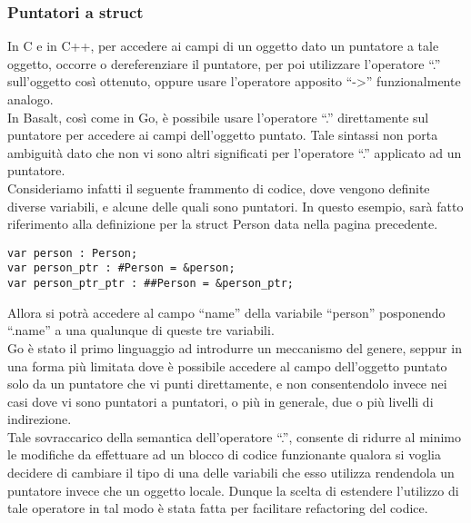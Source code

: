 \subsubsection{Puntatori a struct}
In C e in C++, per accedere ai campi di un oggetto dato un puntatore a tale oggetto, occorre o dereferenziare il 
puntatore, per poi utilizzare l’operatore “.” sull’oggetto così ottenuto, oppure usare l'operatore 
apposito “->” funzionalmente analogo. \\ 

In Basalt, così come in Go, è possibile usare l’operatore “.” direttamente sul puntatore per accedere ai campi 
dell’oggetto puntato. Tale sintassi non porta ambiguità dato che non vi sono altri 
significati per l’operatore “.” applicato ad un puntatore. \\

Consideriamo infatti il seguente frammento di codice, dove vengono definite diverse variabili, e alcune delle 
quali sono puntatori. In questo esempio, sarà fatto riferimento alla 
definizione per la struct Person data nella pagina precedente. \\

\vspace{0.5cm}
\begin{lstlisting}[frame=single]
var person : Person;
var person_ptr : #Person = &person;
var person_ptr_ptr : ##Person = &person_ptr;
\end{lstlisting}
\vspace{0.5cm}
 
Allora si potrà accedere al campo “name” della variabile “person” posponendo 
“.name” a una qualunque di queste tre variabili. \\ 

Go è stato il primo linguaggio ad introdurre un meccanismo del genere, seppur in una forma 
più limitata dove è possibile accedere al campo dell’oggetto puntato solo da un 
puntatore che vi punti direttamente, e non consentendolo invece nei casi dove vi 
sono puntatori a puntatori, o più in generale, due o più livelli di indirezione. \\ 

Tale sovraccarico della semantica dell’operatore “.”, consente di ridurre al minimo le 
modifiche da effettuare ad un blocco di codice funzionante qualora si voglia decidere 
di cambiare il tipo di una delle variabili che esso utilizza rendendola un puntatore 
invece che un oggetto locale. Dunque la scelta di estendere l’utilizzo di tale 
operatore in tal modo è stata fatta per facilitare refactoring del codice. \\ 

